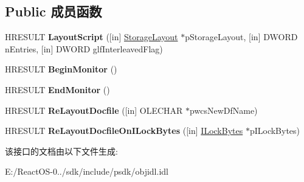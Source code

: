 \subsection*{Public 成员函数}
\begin{DoxyCompactItemize}
\item 
\mbox{\label{interface_i_layout_storage_a30f1efbf2cce0b0cc3a5a6b685b9d272}} 
H\+R\+E\+S\+U\+LT {\bfseries Layout\+Script} (\mbox{[}in\mbox{]} \hyperlink{struct_i_layout_storage_1_1tag_storage_layout}{Storage\+Layout} $\ast$p\+Storage\+Layout, \mbox{[}in\mbox{]} D\+W\+O\+RD n\+Entries, \mbox{[}in\mbox{]} D\+W\+O\+RD glf\+Interleaved\+Flag)
\item 
\mbox{\label{interface_i_layout_storage_abf0885b19ff318349dac5ef62d3e1ce0}} 
H\+R\+E\+S\+U\+LT {\bfseries Begin\+Monitor} ()
\item 
\mbox{\label{interface_i_layout_storage_a0156d20a76072cea9a2f2c99f23b3ed0}} 
H\+R\+E\+S\+U\+LT {\bfseries End\+Monitor} ()
\item 
\mbox{\label{interface_i_layout_storage_a0b44544c4fafd22d1b160b3e068430d6}} 
H\+R\+E\+S\+U\+LT {\bfseries Re\+Layout\+Docfile} (\mbox{[}in\mbox{]} O\+L\+E\+C\+H\+AR $\ast$pwcs\+New\+Df\+Name)
\item 
\mbox{\label{interface_i_layout_storage_a8a6109cb6bfa912efafe470d07871f0d}} 
H\+R\+E\+S\+U\+LT {\bfseries Re\+Layout\+Docfile\+On\+I\+Lock\+Bytes} (\mbox{[}in\mbox{]} \hyperlink{interface_i_lock_bytes}{I\+Lock\+Bytes} $\ast$p\+I\+Lock\+Bytes)
\end{DoxyCompactItemize}


该接口的文档由以下文件生成\+:\begin{DoxyCompactItemize}
\item 
E\+:/\+React\+O\+S-\/0../sdk/include/psdk/objidl.\+idl\end{DoxyCompactItemize}
